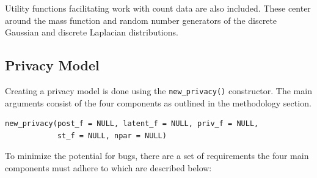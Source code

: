 Utility functions facilitating work with count data are also included.
These center around the mass function and random number generators of the
discrete Gaussian and discrete Laplacian distributions.

\hypertarget{privacy-model}{%
\subsection{Privacy Model}\label{privacy-model}}

Creating a privacy model is done using the \texttt{new\_privacy()} constructor. The
main arguments consist of the four components as outlined in the methodology
section.

\begin{verbatim}
new_privacy(post_f = NULL, latent_f = NULL, priv_f = NULL,
            st_f = NULL, npar = NULL)
\end{verbatim}

To minimize the potential for bugs, there are a set of requirements the four main components
must adhere to which are described below:


